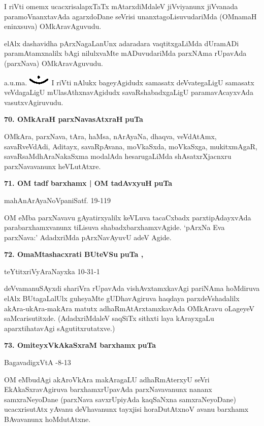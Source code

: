 I riVti omemx ucacxrisalapxTaTx mAtarxdiMdaleV jiVviyanunx jiVvanada paramoVnanxtavAda agarxdoDane seVrisi unanxtagoLisuvudariMda (OMnamaH eninxsuva) OMkAravAguvudu.

elAlx dashavidha pArxNagaLanUnx adaradara vaqtitxgaLiMda dUramADi paramAtamxnalilx bAgi nilulxvaMte mADuvudariMda parxNAma rUpavAda (parxNava) OMkAravAguvudu.

a.u.ma. {\includegraphics[scale=.6]{fig1.eps}} I riVti nAlukx bageyAgidudx samasatx deVvategaLigU samasatx veVdagaLigU mUlasAthxnavAgidudx savaRshabadxgaLigU paramavAcayxvAda vasutxvAgiruvudu.

\medskip
\noindent
\textbf{70. OMkAraH parxNavasAtxraH} \hfill{\bf puTa \pageref{155e}}

\smallskip
OMkAra, parxNava, tAra, haMsa, nArAyaNa, dhaqva, veVdAtAmx, savaRveVdAdi, Aditayx, savaRpAvana, moVkaSxda, moVkaSxga, mukitxmAgaR, savaRsaMdhAraNakaSxma modalAda hesarugaLiMda shAsatxrXjacnxru parxNavavanunx heVLutAtxre.


\medskip
\noindent
\textbf{71. OM tadf barxhamx | OM tadAvxyuH} \hfill{\bf puTa \pageref{156a}}

\hfill{mahAnArAyaNoVpaniSatf. 19-119}

\smallskip
OM eMba parxNavavu gAyatirxyalilx keVLuva tacaCxbadx parxtipAdayxvAda parabarxhamxvanunx tiLisuva shabadxbarxhamxvAgide. `pArxNa Eva parxNava:' AdadxriMda pArxNavAyuvU adeV Agide.

\medskip
\noindent
\textbf{72. OmaMtashacxrati BUteVSu} \hfill{\bf puTa \pageref{125}, \pageref{156}}

\hfill{teYtitxriVyAraNayxka 10-31-1}

\smallskip
deVvamanuSAyxdi shariVra rUpavAda vishAvxtamxkavAgi pariNAma hoMdiruva elAlx BUtagaLalUlx guheyaMte gUDhavAgiruva haqdaya parxdeVshadalilx akAra-ukAra-makAra matutx adhaRmAtArxtamxkavAda OMkAravu oLageyeV saMcarisutitxde. (AdadxriMdaleV saqSiTx sithxti laya kArayxgaLu aparxtihatavAgi sAgutitxrutatxve.)

\medskip
\noindent
\textbf{73. OmiteyxVkAkaSxraM barxhamx} \hfill{\bf puTa \pageref{148b}}

\hfill{BagavadigxVtA -8-13}

\smallskip
OM eMbudAgi akAroVkAra makAragaLU adhaRmAterxyU seVri EkAkaSxravAgiruva barxhamxrUpavAda parxNavavanunx nananx samxraNeyoDane (parxNava savxrUpiyAda kaqSaNxna samxraNeyoDane) ucacxrisutAtx yAvanu deVhavanunx tayxjisi horaDutAtxnoV avanu barxhamx BAvavanunx hoMdutAtxne.

